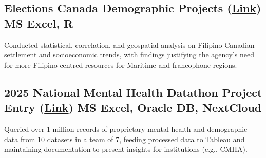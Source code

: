 \subsection{{Elections Canada Demographic Projects (\href{https://github.com/Francis-Calingo/Elections-Canada-Demographic-Projects}{Link}) \hfill MS Excel, R}}
Conducted statistical, correlation, and geospatial analysis on Filipino Canadian settlement and socioeconomic trends,
with findings justifying the agency’s need for more Filipino-centred resources for Maritime and francophone regions.

\vfill

\subsection{{2025 National Mental Health Datathon Project Entry (\href{https://github.com/Francis-Calingo/Proprietary-Data-Projects?tab=readme-ov-file#m2m-tech}{Link}) \hfill  MS Excel, Oracle DB, NextCloud}}
Queried over 1 million records of proprietary mental health and demographic data from 10 datasets in a team of 7,
feeding processed data to Tableau and maintaining documentation to present insights for institutions (e.g., CMHA).